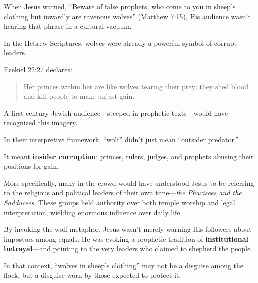 \begin{tcolorbox}[colback=gray!10!white, colframe=gray!50!black, breakable, title={Philosophical Sidebar: Wolves in Shepherd’s Clothing}]

    When Jesus warned, “Beware of false prophets, who come to you in sheep’s clothing but inwardly are ravenous wolves” (Matthew 7:15), His audience wasn’t hearing that phrase in a cultural vacuum.
    
    \medskip
    
    In the Hebrew Scriptures, wolves were already a powerful symbol of corrupt leaders.
    
    \medskip
    
    Ezekiel 22:27 declares:
    
    \begin{quote}
    Her princes within her are like wolves tearing their prey; they shed blood and kill people to make unjust gain.
    \end{quote}
    
    A first-century Jewish audience—steeped in prophetic texts—would have recognized this imagery.
    
    \medskip
    
    In their interpretive framework, “wolf” didn’t just mean “outsider predator.”
    
    \medskip
    
    It meant \textbf{insider corruption}: princes, rulers, judges, and prophets abusing their positions for gain.
    
    \medskip
    
    More specifically, many in the crowd would have understood Jesus to be referring to the religious and political leaders of their own time—\textit{the Pharisees and the Sadducees}. These groups held authority over both temple worship and legal interpretation, wielding enormous influence over daily life.
    
    \medskip
    
    By invoking the wolf metaphor, Jesus wasn’t merely warning His followers about impostors among equals. He was evoking a prophetic tradition of \textbf{institutional betrayal}—and pointing to the very leaders who claimed to shepherd the people.
    
    \medskip
    
    In that context, “wolves in sheep’s clothing” may not be a disguise among the flock, but a disguise worn by those expected to protect it.
    


\end{tcolorbox}

